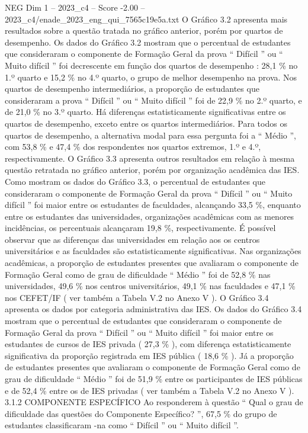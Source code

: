 \begin{textsample}{NEG Dim 1 – 2023\_c4 – Score -2.00 – 2023\_c4/enade\_2023\_eng\_qui\_7565c19e5a.txt}
O Gráfico 3.2 apresenta mais resultados sobre a questão tratada no gráfico anterior, porém por quartos de desempenho.
Os dados do Gráfico 3.2 mostram que o percentual de estudantes que consideraram o componente de Formação Geral da prova “ Difícil ” ou “ Muito difícil ” foi decrescente em função dos quartos de desempenho : 28,1 \% no 1.º quarto e 15,2 \% no 4.º quarto, o grupo de melhor desempenho na prova.
Nos quartos de desempenho intermediários, a proporção de estudantes que consideraram a prova “ Difícil ” ou “ Muito difícil ” foi de 22,9 \% no 2.º quarto, e de 21,0 \% no 3.º quarto.
Há diferenças estatisticamente significativas entre os quartos de desempenho, exceto entre os quartos intermediários.
Para todos os quartos de desempenho, a alternativa modal para essa pergunta foi a “ Médio ”, com 53,8 \% e 47,4 \% dos respondentes nos quartos extremos, 1.º e 4.º, respectivamente.
O Gráfico 3.3 apresenta outros resultados em relação à mesma questão retratada no gráfico anterior, porém por organização acadêmica das IES.
Como mostram os dados do Gráfico 3.3, o percentual de estudantes que consideraram o componente de Formação Geral da prova “ Difícil ” ou “ Muito difícil ” foi maior entre os estudantes de faculdades, alcançando 33,5 \%, enquanto entre os estudantes das universidades, organizações acadêmicas com as menores incidências, os percentuais alcançaram 19,8 \%, respectivamente.
É possível observar que as diferenças das universidades em relação aos os centros universitários e as faculdades são estatisticamente significativas.
Nas organizações acadêmicas, a proporção de estudantes presentes que avaliaram o componente de Formação Geral como de grau de dificuldade “ Médio ” foi de 52,8 \% nas universidades, 49,6 \% nos centros universitários, 49,1 \% nas faculdades e 47,1 \% nos CEFET/IF ( ver também a Tabela V.2 no Anexo V ).
O Gráfico 3.4 apresenta os dados por categoria administrativa das IES.
Os dados do Gráfico 3.4 mostram que o percentual de estudantes que consideraram o componente de Formação Geral da prova “ Difícil ” ou “ Muito difícil ” foi maior entre os estudantes de cursos de IES privada ( 27,3 \% ), com diferença estatisticamente significativa da proporção registrada em IES pública ( 18,6 \% ).
Já a proporção de estudantes presentes que avaliaram o componente de Formação Geral como de grau de dificuldade “ Médio ” foi de 51,9 \% entre os participantes de IES públicas e de 52,4 \% entre os de IES privadas ( ver também a Tabela V.2 no Anexo V ). 3.1.2 COMPONENTE ESPECÍFICO Ao responderem à questão “ Qual o grau de dificuldade das questões do Componente Específico? ”, 67,5 \% do grupo de estudantes classificaram -na como “ Difícil ” ou “ Muito difícil ”.

\end{textsample}

